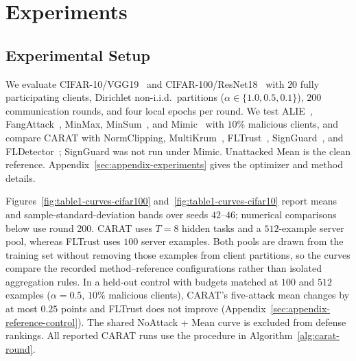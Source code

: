 \section{Experiments}
\label{sec:experiments}
\subsection{Experimental Setup}
We evaluate CIFAR-10/VGG19~\citep{krizhevsky2009learning,simonyan2015verydeep} and CIFAR-100/ResNet18~\citep{he2016deep} with $20$ fully participating clients, Dirichlet non-i.i.d.\ partitions ($\alpha\in\{1.0,0.5,0.1\}$), $200$ communication rounds, and four local epochs per round. We test ALIE~\citep{baruch2019alie}, FangAttack~\citep{fang2020local}, MinMax, MinSum~\citep{shejwalkar2021manipulating}, and Mimic~\citep{karimireddy2022bucketing} with $10\%$ malicious clients, and compare CARAT with NormClipping, MultiKrum~\citep{blanchard2017krum}, FLTrust~\citep{cao2021fltrust}, SignGuard~\citep{xu2022signguard}, and FLDetector~\citep{zhang2022fldetector}; SignGuard was not run under Mimic. Unattacked Mean is the clean reference. Appendix~\ref{sec:appendix-experiments} gives the optimizer and method details.

Figures~\ref{fig:table1-curves-cifar100} and~\ref{fig:table1-curves-cifar10} report means and sample-standard-deviation bands over seeds $42$--$46$; numerical comparisons below use round 200. CARAT uses $T=8$ hidden tasks and a $512$-example server pool, whereas FLTrust uses $100$ server examples. Both pools are drawn from the training set without removing those examples from client partitions, so the curves compare the recorded method--reference configurations rather than isolated aggregation rules. In a held-out control with budgets matched at $100$ and $512$ examples ($\alpha=0.5$, $10\%$ malicious clients), CARAT's five-attack mean changes by at most $0.25$ points and FLTrust does not improve (Appendix~\ref{sec:appendix-reference-control}). The shared NoAttack + Mean curve is excluded from defense rankings. All reported CARAT runs use the procedure in Algorithm~\ref{alg:carat-round}.


